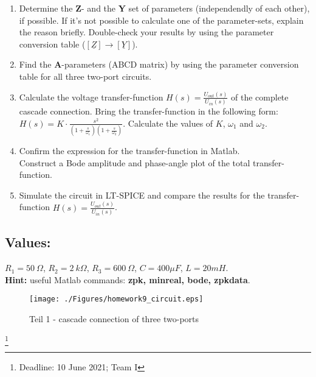 \documentclass[a4paper]{article}
\newcommand\blfootnote[1]{%
	\begingroup
	\renewcommand\thefootnote{}\footnote{#1}%
	\addtocounter{footnote}{-1}%
	\endgroup
}
\begin{document}
	\begin{enumerate}
		\item Determine the \textbf{Z}- and the \textbf{Y} set of parameters (independendly of each other), if possible. If it's not possible to calculate one of the parameter-sets, explain the reason briefly. Double-check your results by using the parameter conversion table ($[\underline{Z}] \rightarrow [\underline{Y}]$).
		
		\item Find the \textbf{A}-parameters (ABCD matrix) by using the parameter conversion table for all three two-port circuits.

		\item Calculate the voltage transfer-function $H(s) = \frac{U_{out}(s)}{U_{in}(s)}$ of the complete cascade connection. Bring the transfer-function in the following form: $H(s) = K\cdot \frac{s^2}{(1+\frac{s}{\omega_1})(1+\frac{s}{\omega_2})}$. Calculate the values of $K$, $\omega_1$ and $\omega_2$.

		\item Confirm the expression for the transfer-function in Matlab. \\
		Construct a Bode amplitude and phase-angle plot of the total transfer-function. 
		
		\item Simulate the circuit in LT-SPICE and compare the results for the transfer-function $H(s) = \frac{U_{out}(s)}{U_{in}(s)}$. 
	\end{enumerate}

	\subsection*{Values:}
$R_1=50~\Omega $, $R_2=2~k\Omega$, $R_3=600~\Omega$, $C=400 \mu F$, $L=20mH$.
\vspace{0.5cm}\\
\textbf{\textbf{Hint:} }
useful Matlab commands: \textbf{zpk, minreal, bode, zpkdata}.
 	
 	\begin{figure}[h!]
 		\centering
 		\texttt{[image: ./Figures/homework9\_circuit.eps]}
 		\caption{Teil 1 - cascade connection of three two-ports}
 		\label{circuit}
 	\end{figure}
\vspace{3.5cm}
 	\blfootnote{Deadline: 10 June 2021; \qquad Team I}
\end{document}
